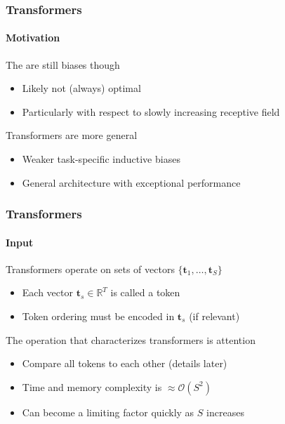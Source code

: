 \documentclass[xetex,professionalfont]{beamer}
\renewcommand\emph[1]{\textcolor{tuwcvl_cvl_blue}{#1}}
\newcommand{\RR}{\mathbb{R}}
\renewcommand{\vec}[1]{\ensuremath{\mathbf{#1}}}
\newcommand{\vt}{\vec{t}}
\begin{document}
\begin{frame}
	\frametitle{Transformers}
	\framesubtitle{Motivation}

	The are still biases though
	\begin{itemize}
		\item Likely not (always) optimal
		\item Particularly with respect to slowly increasing receptive field
	\end{itemize}

	\bigskip

	Transformers are more general
	\begin{itemize}
		\item Weaker task-specific inductive biases %
		\item General architecture with exceptional performance
	\end{itemize}

\end{frame}


\begin{frame}
	\frametitle{Transformers}
	\framesubtitle{Input}

	Transformers operate on \emph{sets} of vectors $\{\vt_1,\dots,\vt_S\}$
	\begin{itemize}
		\item Each vector $\vt_s\in\RR^T$ is called a \emph{token} %
		\item Token ordering must be encoded in $\vt_s$ (if relevant)
	\end{itemize}

	\bigskip

	The operation that characterizes transformers is \emph{attention}
	\begin{itemize}
		\item Compare all tokens to each other (details later)
		\item Time and memory complexity is $\approx\mathcal{O}(S^2)$ %
		\item Can become a limiting factor quickly as $S$ increases
	\end{itemize}

\end{frame}
\end{document}
